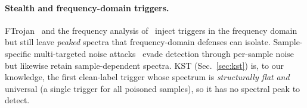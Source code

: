\paragraph{Stealth and frequency-domain triggers.}
FTrojan~\cite{wang2021ftrojan} and the frequency analysis
of~\cite{zeng2021frequency} inject triggers in the frequency domain but still
leave \emph{peaked} spectra that frequency-domain defenses can isolate.
Sample-specific multi-targeted noise attacks~\cite{miah2024noiseattack} evade
detection through per-sample noise but likewise retain sample-dependent spectra.
KST (Sec.~\ref{sec:kst}) is, to our knowledge, the first clean-label trigger
whose spectrum is \emph{structurally flat} \emph{and} universal (a single
trigger for all poisoned samples), so it has no spectral peak to detect.
